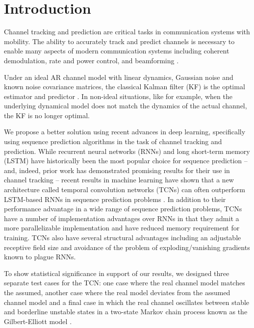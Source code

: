 \documentclass[twocolumn,letterpaper]{IEEEAerospaceCLS}  %
\begin{document}
\tableofcontents

\section{Introduction}
\label{sec:intro}

Channel tracking and prediction are critical tasks in communication systems with mobility. The ability to accurately track and predict channels is necessary to enable many aspects of modern communication systems including coherent demodulation, rate and power control, and beamforming \cite{181202986}.

Under an ideal AR channel model with linear dynamics, Gaussian noise and known noise covariance matrices, the classical Kalman filter (KF) is the optimal estimator and predictor \cite{kay1993fundamentals}.  In  non-ideal  situations,  like  for  example,  when  the underlying dynamical model does not match the dynamics of the actual channel, the KF is no longer optimal. 

We propose a better solution using recent advances in deep  learning, specifically using sequence prediction algorithms in the task of  channel  tracking  and  prediction. While recurrent neural networks (RNNs) and long short-term memory (LSTM) have historically been the most popular choice for sequence prediction -- and, indeed, prior work has demonstrated promising results for their use in channel tracking \cite{7508408} \cite{hochreiter1997long} -- recent results in machine learning have shown that a new architecture called temporal convolution networks (TCNs) can often outperform LSTM-based RNNs in sequence prediction problems \cite{BaiTCN2018}.  In addition to their performance advantage in a wide range of sequence prediction problems, TCNs have a number of implementation advantages over RNNs in that they admit a more parallelizable implementation and have reduced memory requirement for training. TCNs also have several structural advantages including an adjustable receptive field size and avoidance of the problem of exploding/vanishing gradients known to plague RNNs.

To show statistical significance in support of our results, we designed three separate test cases for the TCN: one case where the real channel model matches the assumed, another case where the real model deviates from the assumed channel model and a final case in which the real channel oscillates between stable and borderline unstable states in a two-state Markov chain process known as the Gilbert-Elliott model \cite{laourine2010betting}. 
\end{document}
